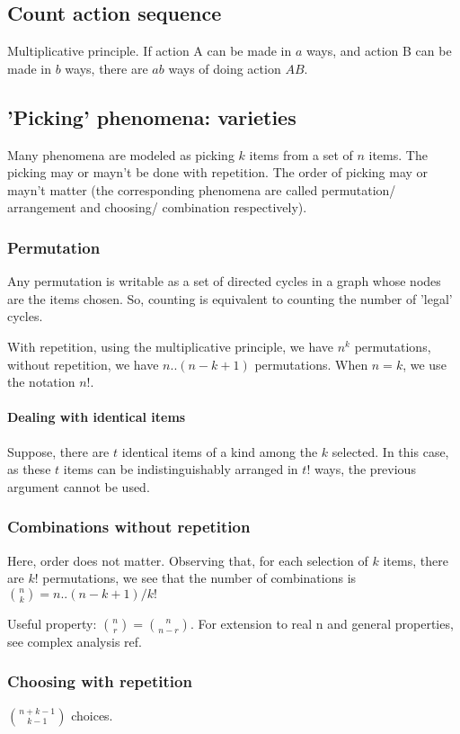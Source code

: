 \documentclass[oneside, article]{memoir}
\begin{document}
\subsection{Count action sequence}
Multiplicative principle. If action A can be made in $a$ ways, and action B can be made in $b$ ways, there are $ab$ ways of doing action $AB$.

\subsection{'Picking' phenomena: varieties}
Many phenomena are modeled as picking $k$ items from a set of $n$ items. The picking may or mayn't be done with repetition. The order of picking may or mayn't matter (the corresponding phenomena are called permutation/ arrangement and choosing/ combination respectively).

\subsubsection{Permutation}
Any permutation is writable as a set of directed cycles in a graph whose nodes are the items chosen. So, counting is equivalent to counting the number of 'legal' cycles.

With repetition, using the multiplicative principle, we have $n^k$ permutations, without repetition, we have $n..(n-k+1)$ permutations. When $n =k$, we use the notation $n!$.

\paragraph{Dealing with identical items}
Suppose, there are $t$ identical items of a kind among the $k$ selected. In this case, as these $t$ items can be indistinguishably arranged in $t!$ ways, the previous argument cannot be used.

\subsubsection{Combinations without repetition}
Here, order does not matter. Observing that, for each selection of $k$ items, there are $k!$ permutations, we see that the number of combinations is $\binom{n}{k} = n..(n-k+1)/k!$

Useful property: $\binom{n}{r} = \binom{n}{n-r}$. For extension to real n and general properties, see complex analysis ref.

\subsubsection{Choosing with repetition}
$\binom{n+k-1}{k-1}$ choices. 
\end{document}
